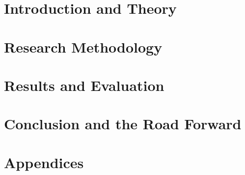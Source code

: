 \documentclass[10pt,b5paper,twoside,openright]{report}
\begin{document}

%
%
%
%
%
%
%
%
%
%
%
%
%


\cleardoublepage

\cleardoublepage

\cleardoublepage
{}


\setcounter{tocdepth}{1}
\dominitoc
\dominilof
\dominilot
\tableofcontents
\clearpage
\listoffigures
\listoftables


\part{Introduction and Theory}


\part{Research Methodology}

\part{Results and Evaluation}


\part{Conclusion and the Road Forward}

\let\cleardoublepage\clearpage




\cleardoublepage
{}

\part{Appendices}

\appendix
{}



\end{document}

